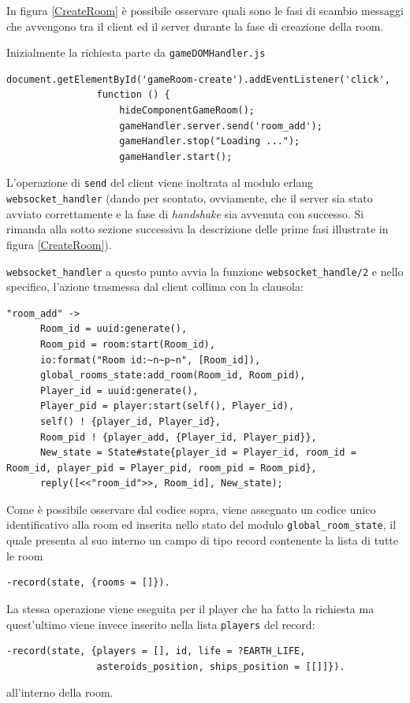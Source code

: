 \documentclass[paper=a4, fontsize=11pt]{scrartcl} %
\numberwithin{equation}{section} %
\numberwithin{figure}{section} %
\numberwithin{table}{section} %
\begin{document}
In figura \ref{CreateRoom} è possibile osservare quali sono le fasi di scambio messaggi che avvengono tra il client ed il server durante la fase di creazione della room.

Inizialmente la richiesta parte da \texttt{gameDOMHandler.js}

\begin{lstlisting}[basicstyle=\footnotesize]
document.getElementById('gameRoom-create').addEventListener('click',
				function () {
                    hideComponentGameRoom();
                    gameHandler.server.send('room_add');
                    gameHandler.stop("Loading ...");
                    gameHandler.start();
\end{lstlisting}

L'operazione di \texttt{send} del client viene inoltrata al modulo erlang \texttt{websocket\_handler} (dando per scontato, ovviamente, che il server sia stato avviato correttamente e la fase di \textit{handshake} sia avvenuta con successo. Si rimanda alla sotto sezione successiva la descrizione delle prime fasi illustrate in figura \ref{CreateRoom}).

\texttt{websocket\_handler} a questo punto avvia la funzione \texttt{websocket\_handle/2} e nello specifico, l'azione trasmessa dal client collima con la clausola:
\begin{lstlisting}[basicstyle=\footnotesize]
"room_add" ->
      Room_id = uuid:generate(),
      Room_pid = room:start(Room_id),
      io:format("Room id:~n~p~n", [Room_id]),
      global_rooms_state:add_room(Room_id, Room_pid),
      Player_id = uuid:generate(),
      Player_pid = player:start(self(), Player_id),
      self() ! {player_id, Player_id},
      Room_pid ! {player_add, {Player_id, Player_pid}},
      New_state = State#state{player_id = Player_id, room_id = Room_id, player_pid = Player_pid, room_pid = Room_pid},
      reply([<<"room_id">>, Room_id], New_state);
\end{lstlisting}

Come è possibile osservare dal codice sopra, viene assegnato un codice unico identificativo alla room ed inserita nello stato del modulo \texttt{global\_room\_state}, il quale presenta al suo interno un campo di tipo record contenente la lista di tutte le room
\begin{lstlisting}[basicstyle=\footnotesize]
-record(state, {rooms = []}).
\end{lstlisting}
La stessa operazione viene eseguita per il player che ha fatto la richiesta ma quest'ultimo viene invece inserito nella lista \texttt{players} del record:
\begin{lstlisting}[basicstyle=\footnotesize]
-record(state, {players = [], id, life = ?EARTH_LIFE,
				asteroids_position, ships_position = [[]]}).
\end{lstlisting}
all'interno della room.
\end{document}
